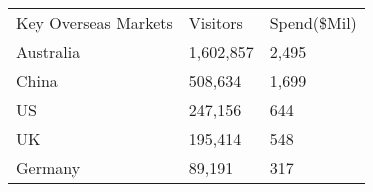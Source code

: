 \begin{tabular}[t]{p{5.4cm}p{0.9cm}p{1.2cm}}
 Key Overseas Markets & Visitors & Spend(\$Mil) \\ 
 Australia & 1,602,857 & 2,495 \\ 
  China &   508,634 & 1,699 \\ 
  US &   247,156 & 644 \\ 
  UK &   195,414 & 548 \\ 
  Germany &    89,191 & 317 \\ 
  \end{tabular}
